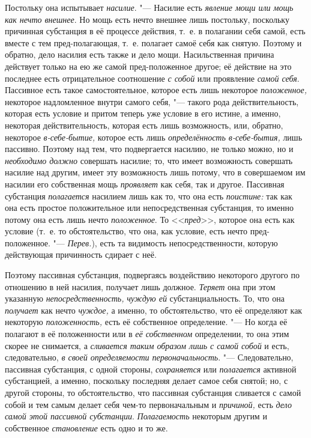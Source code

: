 Постольку она испытывает {\em насилие}. "--- Насилие есть
{\em явление мощи или мощь как нечто внешнее}. Но мощь
есть нечто внешнее лишь постольку, поскольку причинная субстанция в её
процессе действия, т.~е. в полагании себя самой, есть вместе с тем
пред-полагающая, т.~е. полагает самоё себя как снятую. Поэтому и обратно,
дело насилия есть также и дело мощи. Насильственная причина действует
только на ею же самой пред-положенное другое; её действие на это последнее
есть отрицательное соотношение {\em с собой} или
проявление {\em самой себя}. Пассивное есть такое
самостоятельное, которое есть лишь некоторое
{\em положенное,} некоторое надломленное внутри самого
себя, "--- такого рода действительность, которая есть условие и притом теперь
уже условие в его истине, а именно, некоторая действительность, которая
есть лишь возможность, или, обратно, некоторое
{\em в-себе-бытие,} которое есть лишь
{\em определённость в-себе-бытия,} лишь пассивно.
Поэтому над тем, что подвергается насилию, не только можно, но и
{\em необходимо должно} совершать насилие; то, что
имеет возможность совершать насилие над другим, имеет эту возможность лишь
потому, что в совершаемом им насилии его собственная мощь
{\em проявляет} как себя, так и другое. Пассивная
субстанция {\em полагается} насилием лишь как то, что
она есть {\em поистине:} так как она есть простое
положительное или непосредственная субстанция, то именно потому она есть
лишь нечто {\em положенное}. То <<{\em пред}>>, которое она есть как условие
(т.~е. то обстоятельство, что она, как условие, есть нечто
пред-положенное. "--- {\em Перев.}), есть та видимость непосредственности,
которую действующая причинность сдирает с неё.

Поэтому пассивная субстанция, подвергаясь воздействию некоторого другого по
отношению в ней насилия, получает лишь должное.
{\em Теряет} она при этом указанную {\em непосредственность,}
{\em чуждую ей} субстанциальность. То, что она {\em получает} как нечто
{\em чуждое,} а именно, то обстоятельство, что её
определяют как некоторую {\em положенность,} есть её
собственное определение. "--- Но когда её полагают в её положенности или в
{\em её собственном} определении, то она этим скорее не
снимается, а {\em сливается таким образом лишь с самой
собой} и есть, следовательно, {\em в своей
определяемости первоначальность}. "--- Следовательно, пассивная субстанция, с
одной стороны, {\em сохраняется} или
{\em полагается} активной субстанцией, а именно,
поскольку последняя делает самое себя снятой; но, с другой стороны, то
обстоятельство, что пассивная субстанция сливается с самой собой и тем
самым делает себя чем-то первоначальным и {\em причиной,} есть {\em дело
самой этой пассивной субстанции}. {\em Полагаемость} некоторым другим и
собственное {\em становление} есть одно и то же.

